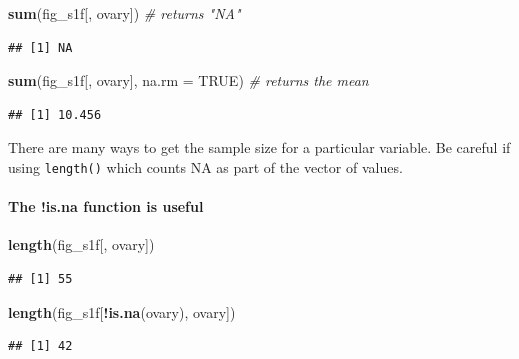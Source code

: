 \documentclass[]{book}
\newenvironment{Shaded}{\begin{snugshade}}{\end{snugshade}}
\newcommand{\CommentTok}[1]{\textcolor[rgb]{0.56,0.35,0.01}{\textit{#1}}}
\newcommand{\DataTypeTok}[1]{\textcolor[rgb]{0.13,0.29,0.53}{#1}}
\newcommand{\KeywordTok}[1]{\textcolor[rgb]{0.13,0.29,0.53}{\textbf{#1}}}
\newcommand{\NormalTok}[1]{#1}
\newcommand{\OperatorTok}[1]{\textcolor[rgb]{0.81,0.36,0.00}{\textbf{#1}}}
\newcommand{\OtherTok}[1]{\textcolor[rgb]{0.56,0.35,0.01}{#1}}
\let\oldparagraph\paragraph
\renewcommand{\paragraph}[1]{\oldparagraph{#1}\mbox{}}
\begin{document}
\begin{Shaded}
\begin{Highlighting}[]
\KeywordTok{sum}\NormalTok{(fig_s1f[, ovary]) }\CommentTok{# returns "NA"}
\end{Highlighting}
\end{Shaded}

\begin{verbatim}
## [1] NA
\end{verbatim}

\begin{Shaded}
\begin{Highlighting}[]
\KeywordTok{sum}\NormalTok{(fig_s1f[, ovary], }\DataTypeTok{na.rm =} \OtherTok{TRUE}\NormalTok{) }\CommentTok{# returns the mean}
\end{Highlighting}
\end{Shaded}

\begin{verbatim}
## [1] 10.456
\end{verbatim}

There are many ways to get the sample size for a particular variable. Be careful if using \texttt{length()} which counts NA as part of the vector of values.

\hypertarget{the-is.na-function-is-useful}{%
\paragraph{The !is.na function is useful}\label{the-is.na-function-is-useful}}

\begin{Shaded}
\begin{Highlighting}[]
\KeywordTok{length}\NormalTok{(fig_s1f[, ovary])}
\end{Highlighting}
\end{Shaded}

\begin{verbatim}
## [1] 55
\end{verbatim}

\begin{Shaded}
\begin{Highlighting}[]
\KeywordTok{length}\NormalTok{(fig_s1f[}\OperatorTok{!}\KeywordTok{is.na}\NormalTok{(ovary), ovary])}
\end{Highlighting}
\end{Shaded}

\begin{verbatim}
## [1] 42
\end{verbatim}
\end{document}
